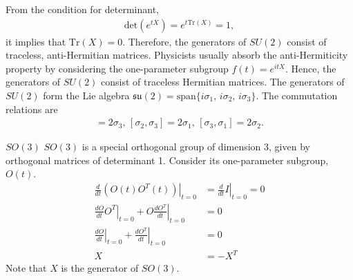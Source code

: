 \documentclass{beamer}
\begin{document}
\begin{frame}
\justify
From the condition for determinant,
\begin{align}
\text{det} (e^{tX}) = e^{t \text{Tr} (X)} = 1,
\end{align}
it implies that $\text{Tr} (X) = 0$.
\vfill
Therefore, the generators of $SU(2)$ consist of traceless, anti-Hermitian matrices.
\vfill
Physicists usually absorb the anti-Hermiticity property by considering the one-parameter subgroup $f(t) = e^{itX}$. Hence, the generators of $SU(2)$ consist of traceless Hermitian matrices.
\vfill
The generators of $SU(2)$ form the Lie algebra $\mathfrak{su}(2) = \text{span} \{i\sigma_1,\, i\sigma_2,\, i\sigma_3 \}$.
\vfill
The commutation relations are
\begin{align}
[\sigma_1,\sigma_2] = 2\sigma_3,\, [\sigma_2,\sigma_3] = 2\sigma_1,\, [\sigma_3,\sigma_1] = 2\sigma_2.
\end{align}
\end{frame}

\begin{frame}{$SO(3)$}
\justify
$SO(3)$ is a special orthogonal group of dimension 3, given by orthogonal matrices of determinant 1.
\vfill
Consider its one-parameter subgroup, $O(t)$.
\begin{align}
\left. \frac{d}{dt} (O(t) O^T(t)) \right|_{t=0} & = \left. \frac{d}{dt} I \right|_{t=0} = 0 \nonumber \\
\left. \frac{dO}{dt} O^T \right|_{t=0} + \left. O \frac{dO^T}{dt} \right|_{t=0} & = 0 \nonumber \\
\left. \frac{dO}{dt} \right|_{t=0} + \left. \frac{dO^T}{dt} \right|_{t=0} & = 0 \nonumber \\
X & = -X^T
\end{align}
Note that $X$ is the generator of $SO(3)$.
\end{frame}
\end{document}
